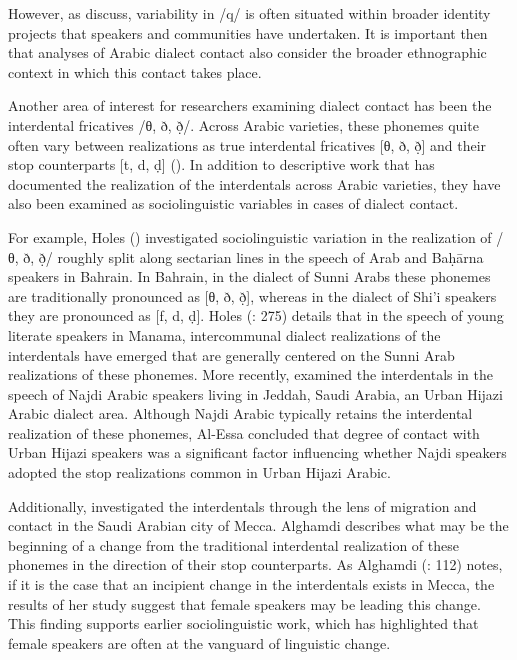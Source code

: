 \documentclass[output=paper]{langsci/langscibook}
\begin{document}
However, as \citet{CotterHoresh2015} discuss, variability in /q/ is often situated within broader identity projects that speakers and communities have undertaken. It is important then that analyses of Arabic dialect contact also consider the broader ethnographic context in which this contact takes place. 

Another area of interest for researchers examining dialect contact has been the interdental fricatives /θ, ð, ð̣/. Across Arabic varieties, these phonemes quite often vary between realizations as true interdental fricatives [θ, ð, ð̣] and their stop counterparts [t, d, ḍ] (\citealt{Al-Wer1997,Al-Wer2003,Al-Wer2011}). In addition to descriptive work that has documented the realization of the interdentals across Arabic varieties, they have also been examined as sociolinguistic variables in cases of dialect contact. 

  For example, Holes (\citeyear{Holes1987,Holes1995}) investigated sociolinguistic variation in the realization of /θ, ð, ð̣/ roughly split along sectarian lines in the speech of Arab and Baḥārna speakers in Bahrain. In Bahrain, in the dialect of Sunni Arabs these phonemes are traditionally pronounced as [θ, ð, ð̣], whereas in the dialect of Shi’i speakers they are pronounced as [f, d, ḍ]. Holes (\citeyear{Holes1995}: 275) details that in the speech of young literate speakers in Manama, intercommunal dialect realizations of the interdentals have emerged that are generally centered on the Sunni Arab realizations of these phonemes. More recently, \citet{Al-Essa2008} examined the interdentals in the speech of Najdi Arabic speakers living in Jeddah, Saudi Arabia, an Urban Hijazi Arabic dialect area. Although Najdi Arabic typically retains the interdental realization of these phonemes, Al-Essa concluded that degree of contact with Urban Hijazi speakers was a significant factor influencing whether Najdi speakers adopted the stop realizations common in Urban Hijazi Arabic. 

Additionally, \citet{Alghamdi2014} investigated the interdentals through the lens of migration and contact in the Saudi Arabian city of Mecca. Alghamdi describes what may be the beginning of a change from the traditional interdental realization of these phonemes in the direction of their stop counterparts. As Alghamdi (\citeyear{Alghamdi2014}: 112) notes, if it is the case that an incipient change in the interdentals exists in Mecca, the results of her study suggest that female speakers may be leading this change. This finding supports earlier sociolinguistic work, which has highlighted that female speakers are often at the vanguard of linguistic change. 
\end{document}

